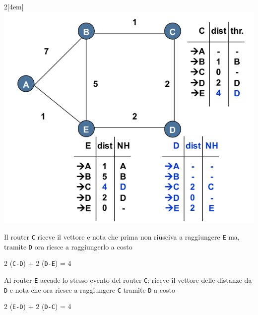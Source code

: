 \documentclass[12pt]{article}
\def\code#1{\texttt{#1}}
\begin{document}
\begin{multicols}{2}[\columnsep4em] 	
	\includegraphics[scale=0.3]{livello_di_rete-img10.png}
	\columnbreak
	
	Il router \code{C} riceve il vettore e nota che prima non riusciva a raggiungere \code{E} ma, tramite \code{D} ora riesce 
	a raggiungerlo a costo 
	\begin{center}
		2 (\code{C-D}) + 2 (\code{D-E}) = 4
	\end{center}
	
	Al router \code{E} accade lo stesso evento del router \code{C}: riceve il vettore delle distanze da \code{D} e nota che 
	ora riesce a raggiungere \code{C} tramite \code{D} a costo 
	\begin{center}
		2 (\code{E-D}) + 2 (\code{D-C}) = 4
	\end{center}
\end{multicols}
\clearpage
\end{document}
